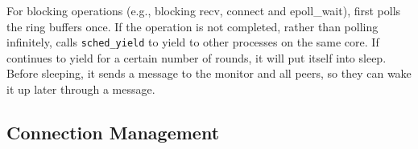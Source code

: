 For blocking operations (e.g., blocking recv, connect and epoll\_wait), \libipc{} first polls the ring buffers once. If the operation is not completed, rather than polling infinitely, \libipc{} calls \texttt{sched\_yield} to yield to other processes on the same core. %
If \libipc{} continues to yield for a certain number of rounds, it will put itself into sleep. Before sleeping, it sends a message to the monitor and all peers, so they can wake it up later through a message.




\subsection{Connection Management}
\label{subsec:connection-management}


